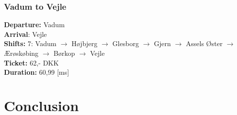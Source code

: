 \subsubsection{Vadum to Vejle}
\textbf{Departure:} Vadum\\
\textbf{Arrival}:   Vejle\\
\textbf{Shifts:}    7: Vadum $\rightarrow$ Højbjerg $\rightarrow$ Glesborg $\rightarrow$ Gjern $\rightarrow$ Assels Øster $\rightarrow$ Ærøskøbing $\rightarrow$ Børkop $\rightarrow$ Vejle \\
\textbf{Ticket:}    62,- DKK \\
\textbf{Duration:}  60,99 [ms]



\section{Conclusion}


